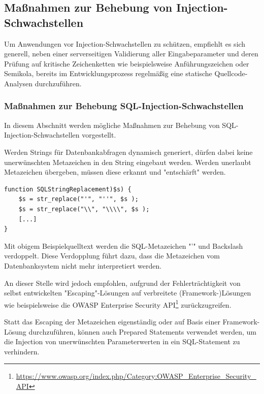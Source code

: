 \subsection{Maßnahmen zur Behebung von Injection-Schwachstellen}

Um Anwendungen vor Injection-Schwachstellen zu schützen, empfiehlt es 
sich generell, neben einer serverseitigen Validierung aller 
Eingabeparameter und deren Prüfung auf kritische Zeichenketten wie 
beispielsweise Anführungszeichen oder Semikola, bereits im 
Entwicklungsprozess regelmäßig eine statische Quellcode-Analysen 
durchzuführen.

\subsubsection{Maßnahmen zur Behebung SQL-Injection-Schwachstellen}
In diesem Abschnitt werden mögliche Maßnahmen zur Behebung von 
SQL-Injection-Schwachstellen vorgestellt.
\newpage
{}\label{escpace_metazeichen}

Werden Strings für Datenbankabfragen dynamisch generiert, dürfen dabei 
keine unerwünschten Metazeichen in den String eingebaut werden. Werden 
unerlaubt Metazeichen übergeben, müssen diese erkannt und "entschärft" 
werden.

\begin{lstlisting}[basicstyle=\ttfamily\footnotesize]
function SQLStringReplacement)$s) {
    $s = str_replace("'", "''", $s );
    $s = str_replace("\\", "\\\\", $s );
    [...]
}
\end{lstlisting}


Mit obigem Beispielquelltext werden die SQL-Metazeichen "'" und Backslash 
verdoppelt. Diese Verdopplung führt dazu, dass die Metazeichen vom 
Datenbanksystem nicht mehr interpretiert werden. 

An dieser Stelle wird jedoch empfohlen, aufgrund der Fehlerträchtigkeit 
von selbst entwickelten "Escaping"-Lösungen auf verbreitete 
(Framework-)Lösungen wie beispielsweise die OWASP Enterprise 
Security API\footnote{\url{https://www.owasp.org/index.php/Category:OWASP\_Enterprise\_Security\_API}} 
zurückzugreifen.


Statt das Escaping der Metazeichen eigenständig oder auf Basis einer 
Framework-Lösung durchzuführen, können auch Prepared Statements verwendet 
werden, um die Injection von unerwünschten Parameterwerten in ein 
SQL-Statement zu verhindern.

